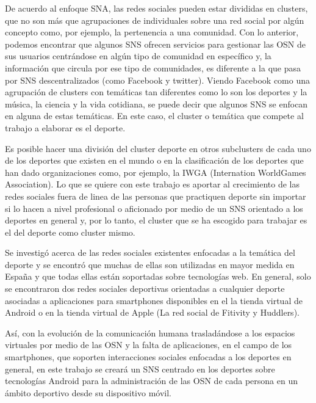 De acuerdo al enfoque SNA, las redes sociales pueden estar divididas en clusters, que no son más que agrupaciones de individuales sobre una red social por algún concepto como, por ejemplo, la pertenencia a una comunidad. Con lo anterior, podemos encontrar que algunos SNS ofrecen servicios para gestionar las OSN de sus usuarios centrándose en algún tipo de comunidad en específico y, la información que circula por ese tipo de comunidades, es diferente a la que pasa por SNS descentralizados (como Facebook y twitter). Viendo Facebook como una agrupación de clusters con temáticas tan diferentes como lo son los deportes y la música, la ciencia y la vida cotidiana, se puede decir que algunos SNS se enfocan en alguna de estas temáticas. En este caso, el cluster o temática que compete al trabajo a elaborar es el deporte.

Es posible hacer una división del cluster deporte en otros subclusters de cada uno de los deportes que existen en el mundo o en la clasificación de los deportes que han dado organizaciones como, por ejemplo, la IWGA (Internation WorldGames Association). Lo que se quiere con este trabajo es aportar al crecimiento de las redes sociales fuera de linea de las personas que practiquen deporte sin importar si lo hacen a nivel profesional o aficionado por medio de un SNS orientado a los deportes en general y, por lo tanto, el cluster que se ha escogido para trabajar es el del deporte como cluster mismo.

Se investigó acerca de las redes sociales existentes enfocadas a la temática del deporte y se encontró que muchas de ellas son utilizadas en mayor medida en España y que todas ellas están soportadas sobre tecnologías web. En general, solo se encontraron dos redes sociales deportivas orientadas a cualquier deporte asociadas a aplicaciones para smartphones disponibles en el la tienda virtual de Android o en la tienda virtual de Apple (La red social de Fitivity y Huddlers).

Así, con la evolución de la comunicación humana trasladándose a los espacios virtuales por medio de las OSN y la falta de aplicaciones, en el campo de los smartphones, que soporten interacciones sociales enfocadas a los deportes en general, en este trabajo se creará un SNS centrado en los deportes sobre tecnologías Android para la administración de las OSN de cada persona en un ámbito deportivo desde su dispositivo móvil.
